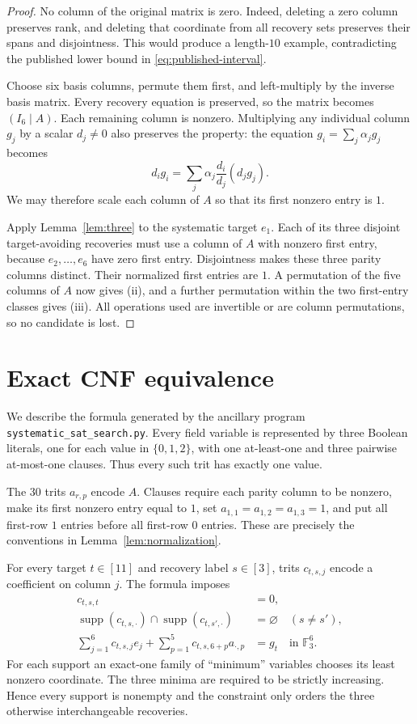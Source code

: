 \documentclass[11pt]{article}
\newcommand{\F}{\mathbb F}
\begin{document}
\begin{proof}
No column of the original matrix is zero.  Indeed, deleting a zero
column preserves rank, and deleting that coordinate from all recovery
sets preserves their spans and disjointness.  This would produce a
length-$10$ example, contradicting the published lower bound in
\eqref{eq:published-interval}.

Choose six basis columns, permute them first, and left-multiply by the
inverse basis matrix.  Every recovery equation is preserved, so the
matrix becomes $(I_6\mid A)$.  Each remaining column is nonzero.
Multiplying any individual column $g_j$ by a scalar $d_j\neq0$ also
preserves the property: the equation
$g_i=\sum_j\alpha_jg_j$ becomes
\[
 d_i g_i=\sum_j \alpha_j\frac{d_i}{d_j}(d_jg_j).
\]
We may therefore scale each column of $A$ so that its first nonzero
entry is $1$.

Apply Lemma~\ref{lem:three} to the systematic target $e_1$.  Each of
its three disjoint target-avoiding recoveries must use a column of $A$
with nonzero first entry, because $e_2,\ldots,e_6$ have zero first
entry.  Disjointness makes these three parity columns distinct.  Their
normalized first entries are $1$.  A permutation of the five columns
of $A$ now gives (ii), and a further permutation within the two
first-entry classes gives (iii).  All operations used are invertible or
are column permutations, so no candidate is lost.
\end{proof}

\section{Exact CNF equivalence}

We describe the formula generated by the ancillary program
\texttt{systematic\_sat\_search.py}.  Every field variable is represented
by three Boolean literals, one for each value in $\{0,1,2\}$, with one
at-least-one and three pairwise at-most-one clauses.  Thus every such
trit has exactly one value.

The $30$ trits $a_{r,p}$ encode $A$.  Clauses require each parity
column to be nonzero, make its first nonzero entry equal to $1$, set
$a_{1,1}=a_{1,2}=a_{1,3}=1$, and put all first-row $1$ entries before
all first-row $0$ entries.  These are precisely the conventions in
Lemma~\ref{lem:normalization}.

For every target $t\in[11]$ and recovery label $s\in[3]$, trits
$c_{t,s,j}$ encode a coefficient on column $j$.  The formula imposes
\begin{align}
  c_{t,s,t}&=0,\label{eq:avoid}\\
  \operatorname{supp}(c_{t,s,\cdot})\cap
  \operatorname{supp}(c_{t,s',\cdot})&=\varnothing
    \quad(s\neq s'),\label{eq:disjoint}\\
  \sum_{j=1}^{6}c_{t,s,j}e_j+
  \sum_{p=1}^{5}c_{t,s,6+p}a_{\cdot,p}&=g_t
    \quad\text{in }\F_3^6.\label{eq:recovery}
\end{align}
For each support an exact-one family of ``minimum'' variables chooses
its least nonzero coordinate.  The three minima are required to be
strictly increasing.  Hence every support is nonempty and the constraint
only orders the three otherwise interchangeable recoveries.
\end{document}
